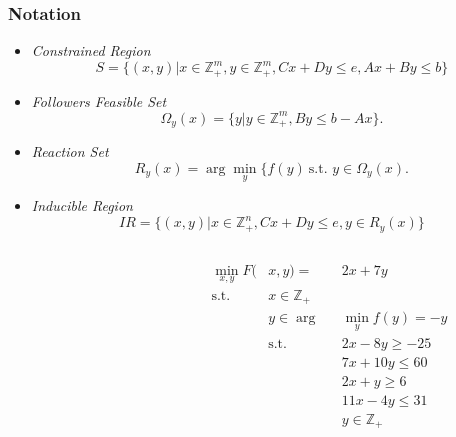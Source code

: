 \documentclass[11pt]{beamer}
\begin{document}
\begin{frame}
	\frametitle{Notation}
	\begin{itemize}
		\item \textit{Constrained Region}
		\begin{equation*}
		S = \{(x,y) | x \in \mathbb{Z}^m_+, y \in \mathbb{Z}^m_+, Cx+Dy \le e, Ax + By \le b \}
		\end{equation*}
		\item \textit{Followers Feasible Set}
		\begin{equation*}
			\Omega_y(x) = \{y| y \in \mathbb{Z}^m_+, By \le b - Ax \}.
		\end{equation*}
		\item \textit{Reaction Set}
		\begin{equation*}
			R_y(x) = \arg \min_y \{f(y) \ \text{s.t. } y \in \Omega_y(x).
		\end{equation*}
		\item \textit{Inducible Region}
		\begin{equation*}
			IR = \{(x,y)| x \in \mathbb{Z}^n_+, Cx+Dy \le e, y \in R_y(x)\}
		\end{equation*}
	\end{itemize}
\end{frame}

\begin{frame}
	\begin{columns}[T] %
		\begin{column}{.48\textwidth}
			
		\end{column}%
		\hfill%
		\begin{column}{.48\textwidth}
			\begin{alignat*}{2}
				\min_{x,y} F(&x,y) =&& 2x + 7y \\
				\text{s.t.}\quad &x \in \mathbb{Z}_+&& \\
				&y \in \arg&& \min_y f(y) = -y \\
				&\text{s.t.}\quad &&2x - 8y \ge -25 \\
				& &&7x + 10y \le 60 \\
				& &&2x + y \ge 6 \\
				& &&11x - 4y \le 31 \\
				& &&y \in \mathbb{Z}_+ 
			\end{alignat*}
		\end{column}%
	\end{columns}
	
\end{frame}
\end{document}
